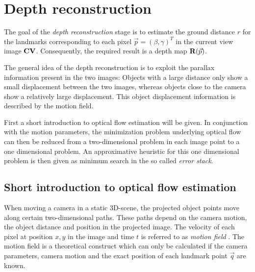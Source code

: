 \section{Depth reconstruction}

\label{sec:outline}

The goal of the \textit{depth reconstruction} stage is to estimate the ground distance $r$ for the landmarks corresponding to each pixel $\vec p = (\beta, \gamma)^T$ in the current view image $\mathbf{CV}$. Consequently, the required result is a depth map $\img{R}(\vec p)$.

The general idea of the depth reconstruction is to exploit the parallax information present in the two images: Objects with a large distance only show a small displacement between the two images, whereas objects close to the camera show a relatively large displacement. This object displacement information is described by the motion field.

First a short introduction to optical flow estimation will be given. In conjunction with the motion parameters, the minimization problem underlying optical flow can then be reduced from a two-dimensional problem in each image point to a one dimensional problem. An approximative heuristic for this one dimensional problem is then given as minimum search in the so called \textit{error stack}.

\subsection{Short introduction to optical flow estimation}

When moving a camera in a static 3D-scene, the projected object points move along certain two-dimensional paths. These paths depend on the camera motion, the object distance and position in the projected image. The velocity of each pixel at position $x, y$ in the image and time $t$ is referred to as \textit{motion field} \citep{flowchapter05}. The motion field is a theoretical construct which can only be calculated if the camera parameters, camera motion and the exact position of each landmark point $\vec q$ are known.

